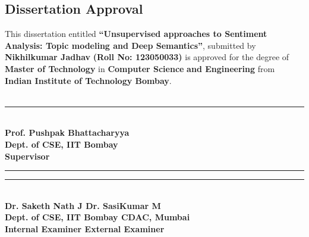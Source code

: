 %
%

\begin{center}
\section*{Dissertation Approval}
\end{center}
This dissertation entitled \textbf{``Unsupervised approaches to Sentiment Analysis: Topic modeling and Deep Semantics''}, submitted by \textbf{Nikhilkumar Jadhav} \textbf{(Roll No: 123050033)} is approved for the degree of \textbf{Master of Technology} in \textbf{Computer Science} \textbf{and Engineering} from \textbf{Indian Institute of Technology Bombay}.\\
\vspace{1.25in}\\
\begin{center}
\rule{200pt}{1pt} \\
\textbf{Prof. Pushpak Bhattacharyya\\
Dept. of CSE, IIT Bombay\\
Supervisor}
\end{center}
\vspace{1in}
\rule{180pt}{1pt} \hfill \rule{210pt}{1pt} \\
\textbf{Dr. Saketh Nath J \hfill Dr. SasiKumar M\\
Dept. of CSE, IIT Bombay \hfill CDAC, Mumbai\\
Internal Examiner \hfill External Examiner}
\vspace{1in}

%